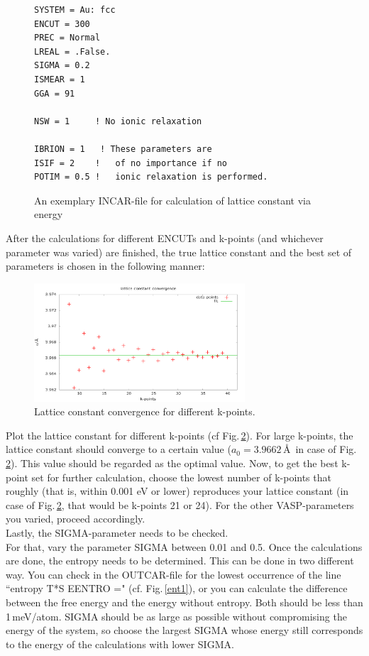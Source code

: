 \documentclass[twoside, 11pt, titlepage, captions=nooneline, a4paper, headsepline]{scrbook}%
\begin{document}
\begin{figure}[h!!]
\begin{verbatim}
SYSTEM = Au: fcc
ENCUT = 300     
PREC = Normal   
LREAL = .False. 
SIGMA = 0.2
ISMEAR = 1              
GGA = 91       

NSW = 1     ! No ionic relaxation
     
IBRION = 1	 ! These parameters are
ISIF = 2    !   of no importance if no
POTIM = 0.5 !   ionic relaxation is performed.
\end{verbatim}
\caption{An exemplary INCAR-file for calculation of lattice constant via energy}
\label{bincar2}
\end{figure}

After the calculations for different ENCUTs and k-points (and whichever parameter was varied) are finished, the true lattice constant and the best set of parameters is chosen in the following manner:\\
\begin{figure}[h!!]
\centering
\includegraphics[width=0.7\textwidth]{Figures/SingleLatticeConstant.png}
\caption{Lattice constant convergence for different k-points.}
\label{kpfit}
\end{figure}
Plot the lattice constant for different k-points (cf Fig.\,\ref{kpfit}). For large k-points, the lattice constant should converge to a certain value ($a_0=3.9662$\,\AA~in case of Fig.\,\ref{kpfit}). This value should be regarded as the optimal value. Now, to get the best k-point set for further calculation, choose the lowest number of k-points that roughly (that is, within 0.001 eV or lower) reproduces your lattice constant (in case of Fig.\,\ref{kpfit}, that would be k-points 21 or 24). For the other VASP-parameters you varied, proceed accordingly.\\
Lastly, the SIGMA-parameter needs to be checked.\\
For that, vary the parameter SIGMA between 0.01 and 0.5. Once the calculations are done, the entropy needs to be determined. This can be done in two different way. You can check in the OUTCAR-file for the lowest occurrence of the line ``entropy T*S    EENTRO =" (cf. Fig.\,\ref{ent1}), or you can calculate the difference between the free energy and the energy without entropy. Both should be less than 1\,meV/atom. SIGMA should be as large as possible without compromising the energy of the system, so choose the largest SIGMA whose energy still corresponds to the energy of the calculations with lower SIGMA.\\
\end{document}
